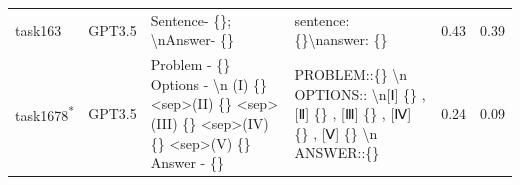 \begin{longtable}{@{}p{0.8cm\tiny}p{1cm\tiny}p{4.1cm\ttfamily\tiny}p{4.1cm\ttfamily\tiny}p{0.8cm\tiny}p{0.8cm\tiny}@{}}
task163   & GPT3.5    & Sentence- \{\}; \textbackslash{}nAnswer- \{\}                                                                                                                                                                                                                                                                                                                                                                                                                                                                           & sentence: \{\}\textbackslash{}nanswer: \{\}                                                                                                                                                                                                                                                                                                                                                                                                                                                                                                                                       & 0.43 & 0.39 \\
task1678\textsuperscript{*}  & GPT3.5    & Problem - \{\}  Options -  \textbackslash{}n (I) \{\} \textless{}sep\textgreater (II) \{\} \textless{}sep\textgreater (III) \{\} \textless{}sep\textgreater (IV) \{\} \textless{}sep\textgreater (V) \{\}  Answer - \{\}                                                                                                                                                                                                                                                                                                & PROBLEM::\{\} \textbackslash{}n OPTIONS:: \textbackslash{}n{[}Ⅰ{]} \{\} , {[}Ⅱ{]} \{\} , {[}Ⅲ{]} \{\} , {[}Ⅳ{]} \{\} , {[}Ⅴ{]} \{\} \textbackslash{}n ANSWER::\{\}                                                                                                                                                                                                                                                                                                                                                                                                                & 0.24 & 0.09 \\

\end{longtable}
